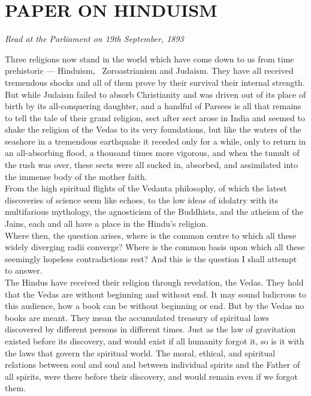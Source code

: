 \section{PAPER ON HINDUISM}
\begin{center}\textit{Read at the Parliament on 19th
September, 1893}\end{center}

Three religions now stand in the world which have come down to
us from time prehistoric — Hinduism,  Zoroastrianism and
Judaism. They have all received tremendous shocks and all of them prove
by their survival their internal strength. But while Judaism failed to
absorb Christianity and was driven out of its place of birth by its
all-conquering daughter, and a handful of Parsees is all that remains
to tell the tale of their grand religion, sect after sect arose in
India and seemed to shake the religion of the Vedas to its very
foundations, but like the waters of the seashore in a tremendous
earthquake it receded only for a while, only to return in an
all-absorbing flood, a thousand times more vigorous, and when the
tumult of the rush was over, these sects were all sucked in, absorbed,
and assimilated into the immense body of the mother faith.\\

From the high spiritual flights of the Vedanta philosophy, of
which the latest discoveries of science seem like echoes, to the low
ideas of idolatry with its multifarious mythology, the agnosticism of
the Buddhists, and the atheism of the Jains, each and all have a place
in the Hindu's religion.\\

Where then, the question arises, where is the common centre to
which all these widely diverging radii converge? Where is the common
basis upon which all these seemingly hopeless contradictions rest? And
this is the question I shall attempt to answer.
\\

The Hindus have received their religion through revelation,
the Vedas. They hold that the Vedas are without beginning and without
end. It may sound ludicrous to this audience, how a book can be without
beginning or end. But by the Vedas no books are meant. They mean the
accumulated treasury of spiritual laws discovered
by different persons in different
times. Just as the law of gravitation existed before
its discovery, and would exist if all humanity forgot it, so is it with
the laws that
govern the spiritual world. The moral, ethical, and spiritual relations
between soul
and soul and between individual spirits and the Father of all spirits,
were there
before their discovery, and would remain even if we forgot them.\\

